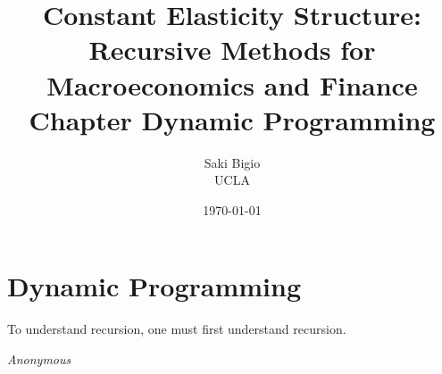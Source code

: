 \documentclass[12pt,openany]{book}
\title{Constant Elasticity Structure: \\ Recursive Methods for Macroeconomics and Finance \\ Chapter Dynamic Programming}
\author{Saki Bigio \\UCLA}
\date{\today}
\begin{document}
\frontmatter
\maketitle

\tableofcontents

\mainmatter

\chapter{Dynamic Programming}

\epigraph{To understand recursion, one must first understand recursion.}{\textit{Anonymous}}



\backmatter


\end{document}

